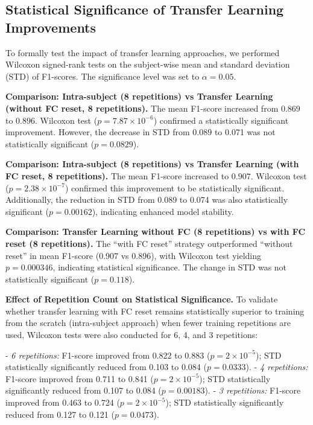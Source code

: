 \begin{multicols}{2}

\subsection*{Statistical Significance of Transfer Learning Improvements}

To formally test the impact of transfer learning approaches, we performed Wilcoxon signed-rank tests on the subject-wise mean and standard deviation (STD) of F1-scores. The significance level was set to $\alpha = 0.05$.

\textbf{Comparison: Intra-subject (8 repetitions) vs Transfer Learning (without FC reset, 8 repetitions).}  
The mean F1-score increased from $0.869$ to $0.896$. Wilcoxon test ($p = 7.87 \times 10^{-6}$) confirmed a statistically significant improvement. However, the decrease in STD from 0.089 to 0.071 was not statistically significant ($p = 0.0829$).

\textbf{Comparison: Intra-subject (8 repetitions) vs Transfer Learning (with FC reset, 8 repetitions).}  
The mean F1-score increased to $0.907$. Wilcoxon test ($p = 2.38 \times 10^{-7}$) confirmed this improvement to be statistically significant. Additionally, the reduction in STD from 0.089 to 0.074 was also statistically significant ($p = 0.00162$), indicating enhanced model stability.

\textbf{Comparison: Transfer Learning without FC (8 repetitions) vs with FC reset (8 repetitions).}  
The ``with FC reset'' strategy outperformed ``without reset'' in mean F1-score (0.907 vs 0.896), with Wilcoxon test yielding $p = 0.000346$, indicating statistical significance. The change in STD was not statistically significant ($p = 0.118$).

\textbf{Effect of Repetition Count on Statistical Significance.}  
To validate whether transfer learning with FC reset remains statistically superior to training from the scratch (intra-subject approach) when fewer training repetitions are used, Wilcoxon tests were also conducted for 6, 4, and 3 repetitions:

- \textit{6 repetitions:} F1-score improved from 0.822 to 0.883 ($p = 2 \times 10^{-5}$); STD statistically significantly reduced from 0.103 to 0.084 ($p = 0.0333$).
- \textit{4 repetitions:} F1-score improved from 0.711 to 0.841 ($p = 2 \times 10^{-5}$); STD statistically significantly reduced from 0.107 to 0.084 ($p = 0.00183$).
- \textit{3 repetitions:} F1-score improved from 0.463 to 0.724 ($p = 2 \times 10^{-5}$); STD statistically significantly reduced from 0.127 to 0.121 ($p = 0.0473$).


\end{multicols}
